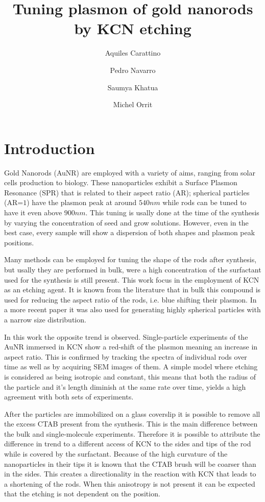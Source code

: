 \documentclass[twocolumn]{article}
\title{Tuning plasmon of gold nanorods by KCN etching}
\author{Aquiles Carattino \and Pedro Navarro \and Saumya Khatua \and Michel
Orrit}
\begin{document}
\maketitle
{}

\section{Introduction}
Gold Nanorods (AuNR) are employed with a variety of aims, ranging from solar
cells production to biology. These nanoparticles exhibit a Surface Plasmon
Resonance (SPR) that is related to their aspect ratio (AR); spherical particles
(AR=$1$) have the plasmon peak at around $540nm$ while rods can be tuned to have
it even above $900nm$. This tuning is usally done at the time of the synthesis
by varying the concentration of seed and grow solutions. However, even in the
best case, every sample will show a dispersion of both shapes and plasmon peak
positions. 

Many methods can be employed for tuning the shape of the rods after synthesis,
but usally they are performed in bulk, were a high concentration of the
surfactant used for the synthesis is still present. This work focus in the
employment of KCN as an etching agent. It is known from the literature that
in bulk this compound is used for reducing the aspect ratio of the rods, i.e.
blue shifting their plasmon. In a more recent paper it was also used for
generating highly spherical particles with a narrow size distribution. 

In this work the opposite trend is observed. Single-particle experiments of the
AuNR immersed in KCN show a red-shift of the plasmon meaning an increase in
aspect ratio. This is confirmed by tracking the spectra of individual rods over
time as well as by acquiring SEM images of them. A simple model where etching is
considered as being isotropic and constant, this means that both the radius of
the particle and it's length diminish at the same rate over time, yields a high
agreement with both sets of experiments. 

After the particles are immobilized on a glass coverslip it is
possible to remove all the excess CTAB present from the synthesis. This is the
main difference between the bulk and single-molecule experiments. Therefore it
is possible to attribute the difference in trend to a different access of KCN to
the sides and tips of the rod while is covered by the surfactant. Because of the
high curvature of the nanoparticles in their tips it is known that the CTAB
brush will be coarser than in the sides. This creates a directionality in the
reaction with KCN that leads to a shortening of the rods. When this anisotropy
is not present it can be expected that the etching is not dependent on the
position.
\end{document}
